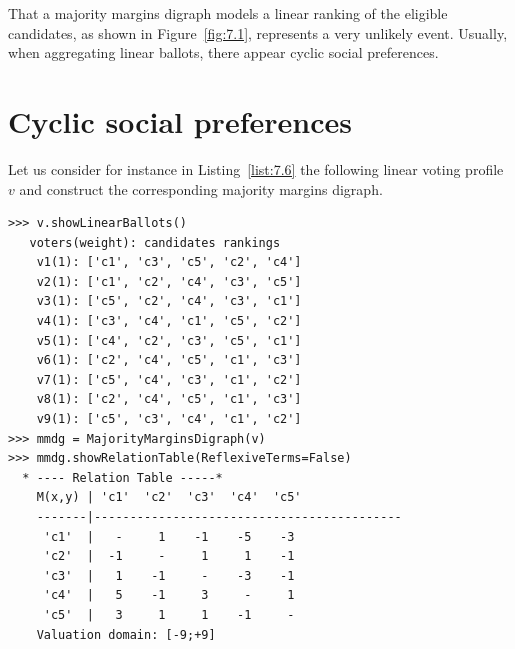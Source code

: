 That a majority margins digraph models a linear ranking of the eligible candidates, as shown in Figure~\vref{fig:7.1}, represents a very unlikely event. Usually, when aggregating linear ballots, there appear cyclic social preferences.

\section{Cyclic social preferences}
\label{sec:7.4}

Let us consider for instance in Listing~\vref{list:7.6} the following linear voting profile $v$ and construct the corresponding majority margins digraph.
\begin{lstlisting}[caption={Example of cyclic social preferences},label=list:7.6]
>>> v.showLinearBallots()
   voters(weight): candidates rankings
    v1(1): ['c1', 'c3', 'c5', 'c2', 'c4']
    v2(1): ['c1', 'c2', 'c4', 'c3', 'c5']
    v3(1): ['c5', 'c2', 'c4', 'c3', 'c1']
    v4(1): ['c3', 'c4', 'c1', 'c5', 'c2']
    v5(1): ['c4', 'c2', 'c3', 'c5', 'c1']
    v6(1): ['c2', 'c4', 'c5', 'c1', 'c3']
    v7(1): ['c5', 'c4', 'c3', 'c1', 'c2']
    v8(1): ['c2', 'c4', 'c5', 'c1', 'c3']
    v9(1): ['c5', 'c3', 'c4', 'c1', 'c2']
>>> mmdg = MajorityMarginsDigraph(v)
>>> mmdg.showRelationTable(ReflexiveTerms=False)
  * ---- Relation Table -----*
    M(x,y) | 'c1'  'c2'  'c3'  'c4'  'c5'	  
    -------|-------------------------------------------
     'c1'  |   -     1    -1    -5    -3	 
     'c2'  |  -1     - 	   1     1    -1	 
     'c3'  |   1    -1 	   -    -3    -1	 
     'c4'  |   5    -1     3     -     1	 
     'c5'  |   3     1 	   1    -1     - 	 
    Valuation domain: [-9;+9]
\end{lstlisting}    

